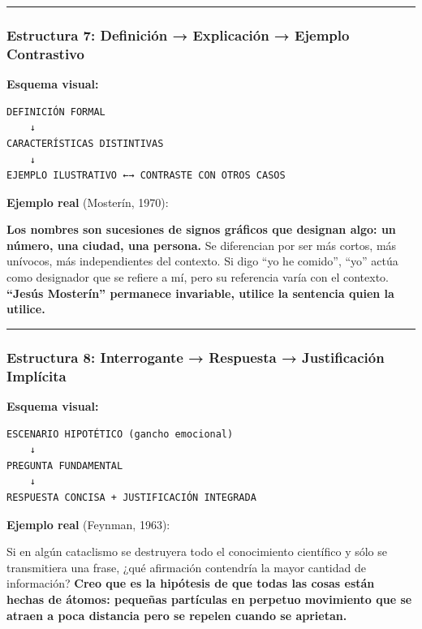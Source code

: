 \documentclass[
  11pt,
]{beaner}
\begin{document}
\begin{center}\rule{0.5\linewidth}{0.5pt}\end{center}

\subsubsection{Estructura 7: Definición → Explicación → Ejemplo
Contrastivo}\label{estructura-7-definiciuxf3n-explicaciuxf3n-ejemplo-contrastivo}

\textbf{Esquema visual:}

\begin{verbatim}
DEFINICIÓN FORMAL
    ↓
CARACTERÍSTICAS DISTINTIVAS
    ↓
EJEMPLO ILUSTRATIVO ←→ CONTRASTE CON OTROS CASOS
\end{verbatim}

\textbf{Ejemplo real} (Mosterín, 1970):

{\textbf{Los nombres son sucesiones de signos gráficos que designan
algo: un número, una ciudad, una persona.}} Se diferencian por ser más
cortos, más unívocos, más independientes del contexto. Si digo ``yo he
comido'', ``yo'' actúa como designador que se refiere a mí, pero su
referencia varía con el contexto. {\textbf{``Jesús Mosterín'' permanece
invariable, utilice la sentencia quien la utilice.}}

\begin{center}\rule{0.5\linewidth}{0.5pt}\end{center}

\subsubsection{Estructura 8: Interrogante → Respuesta → Justificación
Implícita}\label{estructura-8-interrogante-respuesta-justificaciuxf3n-impluxedcita}

\textbf{Esquema visual:}

\begin{verbatim}
ESCENARIO HIPOTÉTICO (gancho emocional)
    ↓
PREGUNTA FUNDAMENTAL
    ↓
RESPUESTA CONCISA + JUSTIFICACIÓN INTEGRADA
\end{verbatim}

\textbf{Ejemplo real} (Feynman, 1963):

Si en algún cataclismo se destruyera todo el conocimiento científico y
sólo se transmitiera una frase, ¿qué afirmación contendría la mayor
cantidad de información? {\textbf{Creo que es la hipótesis de que todas
las cosas están hechas de átomos: pequeñas partículas en perpetuo
movimiento que se atraen a poca distancia pero se repelen cuando se
aprietan.}}
\end{document}
